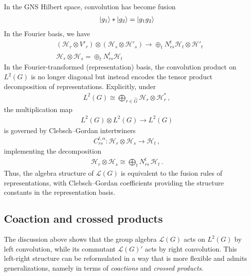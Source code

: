 \documentclass{article}
\newcommand{\mH}{\mathcal{H}}
\newcommand{\nn}{\nonumber}
\theoremstyle{definition}
\begin{document}
In the GNS Hilbert space, convolution has become fusion
\begin{align}
    \ket{g_1}*\ket{g_2}=\ket{g_1g_2}
\end{align}
In the Fourier basis, we have
\begin{align}
    &(\mH_r\otimes V'_r)\otimes (\mH_s\otimes \mH'_s)\to \oplus_t N^t_{rs}\mH_t\otimes \mH'_t\nn\\
    &\mH_r\otimes \mH_s=\oplus_t N^t_{rs}\mH_t
\end{align}
In the Fourier-transformed (representation) basis, the convolution product on \(L^2(G)\) is no longer diagonal but instead encodes the tensor product decomposition of representations. Explicitly, under
\begin{align}
L^2(G) \cong \bigoplus_{r \in \hat G} \mH_r \otimes \mH_r^* \,,
\end{align}
the multiplication map
\begin{align}
L^2(G) \otimes L^2(G) \to L^2(G)
\end{align}
is governed by Clebsch--Gordan intertwiners
\begin{align}
C^{t,\alpha}_{rs} : \mH_r \otimes \mH_s \to \mH_t \,,
\end{align}
implementing the decomposition
\begin{align}
\mH_r \otimes \mH_s \cong \bigoplus_t N_{rs}^t \, \mH_t \,.
\end{align}
Thus, the algebra structure of \(\mathcal{L}(G)\) is equivalent to the fusion rules of representations, with Clebsch--Gordan coefficients providing the structure constants in the representation basis.

\subsection{Coaction and crossed products}

The discussion above shows that the group algebra \(\mathcal{L}(G)\) acts on \(L^2(G)\) by left convolution, while its commutant \(\mathcal{L}(G)'\) acts by right convolution. This left-right structure can be reformulated in a way that is more flexible and admits generalizations, namely in terms of \emph{coactions} and \emph{crossed products}.

\end{document}
